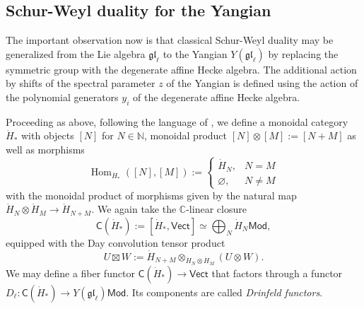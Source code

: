 \documentclass[11pt]{report}
\theoremstyle{definition}
\theoremstyle{remark}
\theoremstyle{remark}
\newcommand{\Hom}{\operatorname{Hom}}
\newcommand{\N}{\mathbb{N}}
\newcommand{\C}{\mathbb{C}}
\begin{document}
\subsection{Schur-Weyl duality for the Yangian}

The important observation now is that classical Schur-Weyl duality may be generalized from the Lie algebra $\mathfrak{gl}_\ell$ to the Yangian $Y(\mathfrak{gl}_\ell)$ by replacing the symmetric group with the degenerate affine Hecke algebra. The additional action by shifts of the spectral parameter $z$ of the Yangian is defined using the action of the polynomial generators $y_i$ of the degenerate affine Hecke algebra.

Proceeding as above, following the language of \cite{article:davydov:2010}, we define a monoidal category $\dot H_*$ with objects $[N]$ for $N \in \N$, monoidal product $[N] \otimes [M] := [N+M]$ as well as morphisms
\begin{equation*}
\Hom_{\dot H_*}([N],[M]) :=
\begin{cases}
\dot H_N, & N = M \\
\varnothing, & N \neq M
\end{cases}
\end{equation*}
with the monoidal product of morphisms given by the natural map $\dot H_N \otimes \dot H_M \to \dot H_{N+M}$. We again take the $\C$-linear closure
\begin{equation*}
\mathsf{C}(\dot H_*) := [\dot H_*,\mathsf{Vect}] \simeq \bigoplus_N \dot H_N\mathsf{Mod},
\end{equation*}
equipped with the Day convolution tensor product
\begin{equation*}
U \boxtimes W := \dot H_{N+M} \otimes_{\dot H_N \otimes \dot H_M} (U \otimes W).
\end{equation*}
We may define a fiber functor $\mathsf{C}(\dot H_*) \to \mathsf{Vect}$ that factors through a functor $D_\ell: \mathsf{C}(\dot H_*) \to Y(\mathfrak{gl}_\ell)\mathsf{Mod}$. Its components are called \emph{Drinfeld functors}.
\end{document}
